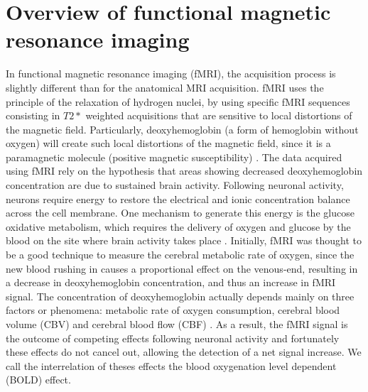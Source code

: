 \section{Overview of functional magnetic resonance imaging} In functional magnetic resonance imaging (fMRI), the acquisition process is slightly different than for the anatomical MRI acquisition. fMRI uses the principle of the relaxation of hydrogen nuclei, by using specific fMRI sequences consisting in $T2*$ weighted acquisitions that are sensitive to local distortions of the magnetic field. Particularly, deoxyhemoglobin (a form of hemoglobin without oxygen) will create such local distortions of the magnetic field, since it is a paramagnetic molecule (positive magnetic susceptibility) \citep{Ogawa1990}. The data acquired using fMRI rely on the hypothesis that areas showing decreased deoxyhemoglobin concentration are due to sustained brain activity. Following neuronal activity, neurons require energy to restore the electrical and ionic concentration balance across the cell membrane. One mechanism to generate this energy is the glucose oxidative metabolism, which requires the delivery of oxygen and glucose by 
the blood on the site where brain activity takes place \citep{Ogawa1990}
. Initially, fMRI was thought to be a good technique to measure the cerebral metabolic rate of oxygen, since the new blood rushing in causes a proportional effect on the venous-end, resulting in a decrease in deoxyhemoglobin concentration, and thus an increase in fMRI signal. The concentration of deoxyhemoglobin actually depends mainly on three factors or phenomena: metabolic rate of oxygen consumption, cerebral blood volume (CBV) and cerebral blood flow (CBF) \citep{Hoge1999}. As a result, the fMRI signal is the outcome of competing effects following neuronal activity
 and fortunately these effects do not cancel out, allowing the detection of a net signal increase. We call the interrelation of theses effects the blood oxygenation level dependent (BOLD) effect.

